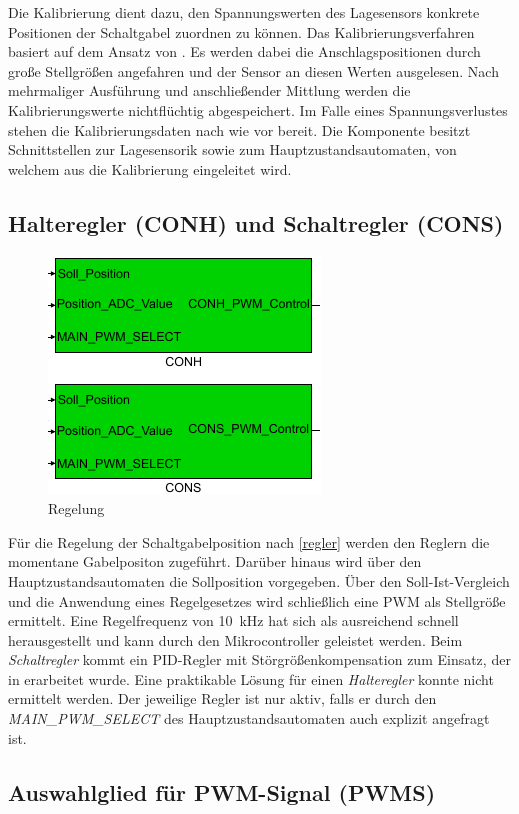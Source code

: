 Die Kalibrierung dient dazu, den Spannungswerten des Lagesensors konkrete Positionen der Schaltgabel zuordnen zu können. Das Kalibrierungsverfahren basiert auf dem Ansatz von \cite{vADP}. Es werden dabei die Anschlagspositionen durch große Stellgrößen angefahren und der Sensor an diesen Werten ausgelesen. Nach mehrmaliger Ausführung und anschließender Mittlung werden die Kalibrierungswerte nichtflüchtig abgespeichert. Im Falle eines Spannungsverlustes stehen die Kalibrierungsdaten nach wie vor bereit. Die Komponente besitzt Schnittstellen zur Lagesensorik sowie zum Hauptzustandsautomaten, von welchem aus die Kalibrierung eingeleitet wird.

\subsection{Halteregler (CONH) und Schaltregler (CONS)}

\begin{figure}[H]%
\centering
\includegraphics[width=0.3\columnwidth]{./Bilder/fig_conh_cons}%
\caption{Regelung}%
\label{fig_conh_cons}%
\end{figure}

Für die Regelung der Schaltgabelposition nach \autoref{regler} werden den Reglern die momentane Gabelpositon zugeführt. Darüber hinaus wird über den Hauptzustandsautomaten die Sollposition vorgegeben. Über den Soll-Ist-Vergleich und die Anwendung eines Regelgesetzes wird schließlich eine PWM als Stellgröße ermittelt. Eine Regelfrequenz von \SI{10}{kHz} hat sich als ausreichend schnell herausgestellt und kann durch den Mikrocontroller geleistet werden. Beim \textit{Schaltregler} kommt ein PID-Regler mit Störgrößenkompensation zum Einsatz, der in \cite{vADP} erarbeitet wurde. Eine praktikable Lösung für einen \textit{Halteregler} konnte nicht ermittelt werden. Der jeweilige Regler ist nur aktiv, falls er durch den \textit{MAIN\_PWM\_SELECT} des Hauptzustandsautomaten auch explizit angefragt ist.
 
\subsection{Auswahlglied für PWM-Signal (PWMS)}


